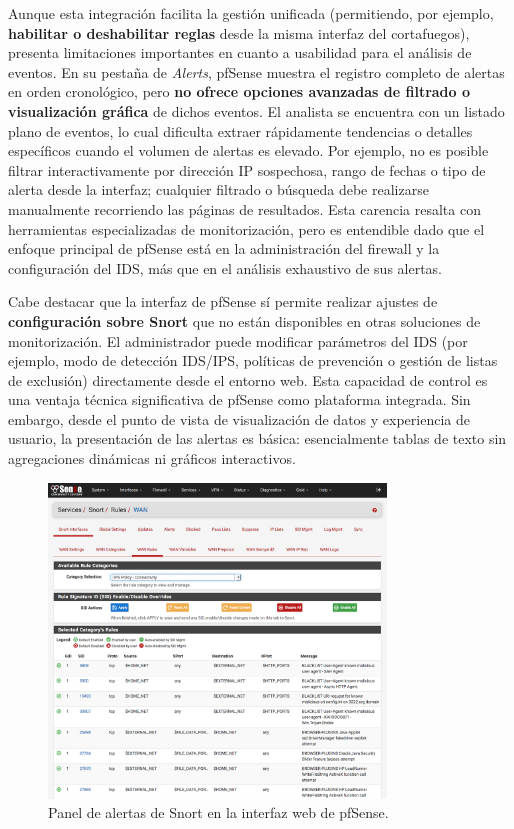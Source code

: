 \documentclass[11pt,a4paper,twoside]{report}
\begin{document}
Aunque esta integración facilita la gestión unificada (permitiendo, por ejemplo, \textbf{habilitar o deshabilitar reglas} desde la misma interfaz del cortafuegos), presenta limitaciones importantes en cuanto a usabilidad para el análisis de eventos. En su pestaña de \emph{Alerts}, pfSense muestra el registro completo de alertas en orden cronológico, pero \textbf{no ofrece opciones avanzadas de filtrado o visualización gráfica} de dichos eventos. El analista se encuentra con un listado plano de eventos, lo cual dificulta extraer rápidamente tendencias o detalles específicos cuando el volumen de alertas es elevado. Por ejemplo, no es posible filtrar interactivamente por dirección IP sospechosa, rango de fechas o tipo de alerta desde la interfaz; cualquier filtrado o búsqueda debe realizarse manualmente recorriendo las páginas de resultados. Esta carencia resalta con herramientas especializadas de monitorización, pero es entendible dado que el enfoque principal de pfSense está en la administración del firewall y la configuración del IDS, más que en el análisis exhaustivo de sus alertas.\newline

Cabe destacar que la interfaz de pfSense sí permite realizar ajustes de \textbf{configuración sobre Snort} que no están disponibles en otras soluciones de monitorización. El administrador puede modificar parámetros del IDS (por ejemplo, modo de detección IDS/IPS, políticas de prevención o gestión de listas de exclusión) directamente desde el entorno web. Esta capacidad de control es una ventaja técnica significativa de pfSense como plataforma integrada. Sin embargo, desde el punto de vista de visualización de datos y experiencia de usuario, la presentación de las alertas es básica: esencialmente tablas de texto sin agregaciones dinámicas ni gráficos interactivos.

\begin{figure}[H]
	\centering
	\includegraphics[width=0.8\textwidth]{documento/1.png}
	\caption{Panel de alertas de Snort en la interfaz web de pfSense.}
	\label{fig:pfsense-alerts}
\end{figure}
\end{document}
